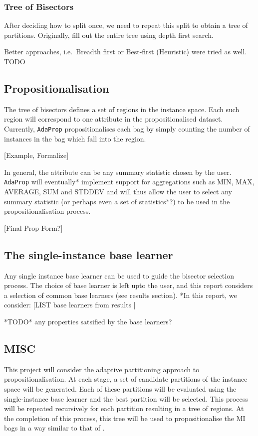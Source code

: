 \documentclass[a4paper,12pt]{article} %
\newcommand{\AdaProp}{\texttt{AdaProp}\xspace}
\begin{document}
\subsubsection{Tree of Bisectors}

After deciding how to split once, we need to repeat this split to obtain a tree of partitions.
Originally, fill out the entire tree using depth first search.

Better approaches, i.e.\ Breadth first or Best-first (Heuristic) were tried as well. TODO

\subsection{Propositionalisation}
The tree of bisectors defines a set of regions in the instance space.
Each such region will correspond to one attribute in the propositionalised dataset.
Currently, \AdaProp propositionalises each bag 
    by simply counting the number of instances in the bag which fall into the region.
    
[Example, Formalize] 

In general, the attribute can be any summary statistic chosen by the user.
\AdaProp will eventually* implement support for aggregations such as 
    MIN, MAX, AVERAGE, SUM and STDDEV and 
    will thus allow the user to select any summary statistic 
    (or perhaps even a set of statistics*?) 
    to be used in the propositionalisation process.
    
[Final Prop Form?]
    

\subsection{The single-instance base learner}    
Any single instance base learner can be used to guide the bisector selection process.
The choice of base learner is left upto the user, and 
    this report considers a selection of common base learners (see results section).
*In this report, we consider: [LIST base learners from results ]    

*TODO* any properties satsified by the base learners?
    
    
\subsection{MISC}
This project will consider the adaptive partitioning approach to propositionalisation.
At each stage, a set of candidate partitions of the instance space will be generated. Each of these partitions will be evaluated using the  single-instance base learner and the best partition will be selected. This process will be repeated recursively for each partition resulting in a tree of regions. At the completion of this process, this tree will be used to propositionalise the MI bags in a way similar to that of .
\end{document}
